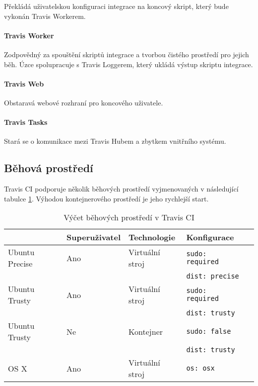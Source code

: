 Překládá uživatelskou konfiguraci integrace na koncový skript, který bude vykonán Travis Workerem.

\paragraph{Travis Worker}

Zodpovědný za spouštění skriptů integrace a tvorbou čistého prostředí pro jejich běh.
Úzce spolupracuje s Travis Loggerem, který ukládá výstup skriptu integrace.

\paragraph{Travis Web}

Obstaravá webové rozhraní pro koncového uživatele.

\paragraph{Travis Tasks}

Stará se o komunikace mezi Travis Hubem a zbytkem vnitřního systému.

\subsection{Běhová prostředí}

Travis CI podporuje několik běhových prostředí vyjmenovaných v následující tabulce \ref{table:travis-env}.
Výhodou kontejnerového prostředí je jeho rychlejší start.

\begin{table}[h]
\centering
\caption{Výčet běhových prostředí v Travis CI}
\label{table:travis-env}
\begin{tabular}{|l|l|l|l|l|}
\hline
& Superuživatel & Technologie & Konfigurace  \\ \hline
Ubuntu Precise & Ano & Virtuální stroj & \verb|sudo: required| \\ 
& & & \verb|dist: precise|  \\ \hline
Ubuntu Trusty & Ano & Virtuální stroj & \verb|sudo: required| \\
& & & \verb|dist: trusty| \\ \hline
Ubuntu Trusty & Ne & Kontejner & \verb|sudo: false|  \\
& & & \verb|dist: trusty| \\ \hline
OS X & Ano & Virtuální stroj & \verb|os: osx|  \\ \hline
\end{tabular}
\end{table}


